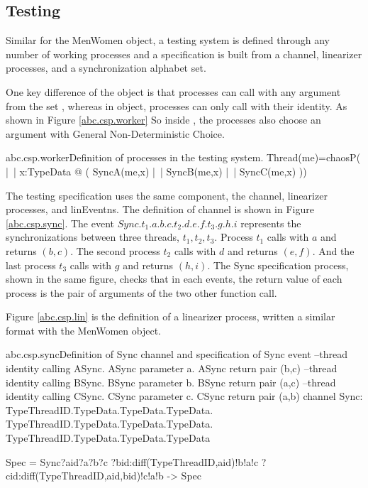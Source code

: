 \documentclass[a4paper, 12pt]{article}
\begin{document}
\subsection{Testing}
Similar for the MenWomen object, a testing system is defined through any number of working processes and a specification is built from a  channel, linearizer processes, and a synchronization alphabet set. 

One key difference of the  object is that processes can call with any argument from the set , whereas in  object, processes can only call with their identity. As shown in Figure \ref{abc.csp.worker} So inside , the processes also choose an argument with General Non-Deterministic Choice. 

\begin{cspinline}{abc.csp.worker}{Definition of processes in the testing system.}
Thread(me)=chaosP( |~| x:TypeData @ (
    SyncA(me,x) 
  |~| SyncB(me,x) 
  |~| SyncC(me,x)
))
\end{cspinline}

The testing specification uses the same component, the  channel, linearizer processes, and linEventns. The definition of  channel is shown in Figure \ref{abc.csp.sync}. The event $Sync.t_1.a.b.c.t_2.d.e.f.t_3.g.h.i$ represents the synchronizations between three threads, $t_1,t_2,t_3$. Process $t_1$ calls  with $a$ and returns $(b,c)$. The second process $t_2$ calls  with $d$ and returns $(e,f)$. And the last process $t_3$ calls  with $g$ and returns $(h,i)$. The Sync specification process, shown in the same figure, checks that in each  events, the return value of each process is the pair of arguments of the two other function call. 

Figure \ref{abc.csp.lin} is the definition of a linearizer process, written a similar format with the MenWomen object.

\begin{cspinline}{abc.csp.sync}{Definition of Sync channel and specification of Sync event}
--thread identity calling ASync. ASync parameter a. ASync return pair (b,c)
--thread identity calling BSync. BSync parameter b. BSync return pair (a,c)
--thread identity calling CSync. CSync parameter c. CSync return pair (a,b)
channel Sync: TypeThreadID.TypeData.TypeData.TypeData.
              TypeThreadID.TypeData.TypeData.TypeData.
              TypeThreadID.TypeData.TypeData.TypeData

Spec = Sync?aid?a?b?c
           ?bid:diff(TypeThreadID,{aid})!b!a!c
           ?cid:diff(TypeThreadID,{aid,bid})!c!a!b 
    -> Spec
\end{cspinline}
\end{document}
